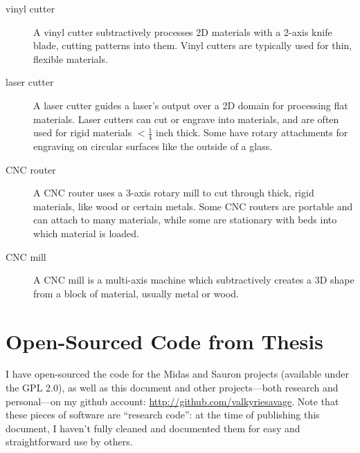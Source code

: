 \begin{description}
\item[vinyl cutter] A vinyl cutter subtractively processes 2D materials with a 2-axis knife blade, cutting patterns into them. Vinyl cutters are typically used for thin, flexible materials.

\item[laser cutter] A laser cutter guides a laser's output over a 2D domain for processing flat materials. Laser cutters can cut or engrave into materials, and are often used for rigid materials $<\frac{1}{4}$ inch thick. Some have rotary attachments for engraving on circular surfaces like the outside of a glass.

\item[CNC router] A CNC router uses a 3-axis rotary mill to cut through thick, rigid materials, like wood or certain metals. Some CNC routers are portable and can attach to many materials, while some are stationary with beds into which material is loaded.

\item[CNC mill] A CNC mill is a multi-axis machine which subtractively creates a 3D shape from a block of material, usually metal or wood.

\end{description}

\chapter{Open-Sourced Code from Thesis}

I have open-sourced the code for the Midas and Sauron projects (available under the GPL 2.0), as well as this document and other projects---both research and personal---on my github account: \url{http://github.com/valkyriesavage}. Note that these pieces of software are ``research code'': at the time of publishing this document, I haven't fully cleaned and documented them for easy and straightforward use by others.